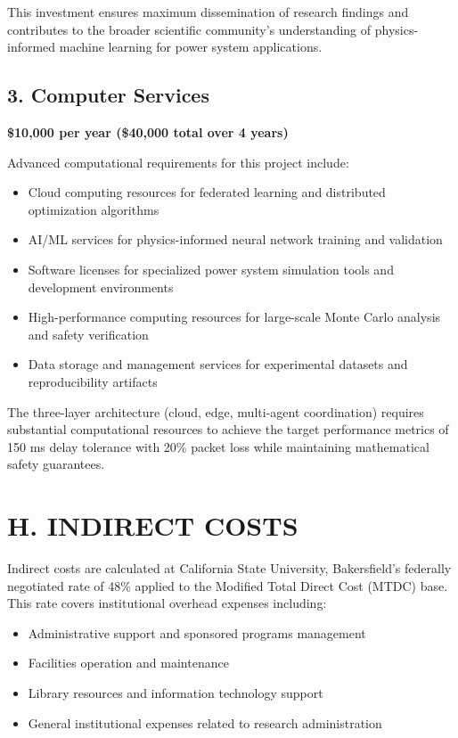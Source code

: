 \documentclass[12pt]{article}
\begin{document}
This investment ensures maximum dissemination of research findings and contributes to the broader scientific community's understanding of physics-informed machine learning for power system applications.

\subsection{3. Computer Services}

\textbf{\$10,000 per year (\$40,000 total over 4 years)}

Advanced computational requirements for this project include:
\begin{itemize}
    \item Cloud computing resources for federated learning and distributed optimization algorithms
    \item AI/ML services for physics-informed neural network training and validation
    \item Software licenses for specialized power system simulation tools and development environments
    \item High-performance computing resources for large-scale Monte Carlo analysis and safety verification
    \item Data storage and management services for experimental datasets and reproducibility artifacts
\end{itemize}

The three-layer architecture (cloud, edge, multi-agent coordination) requires substantial computational resources to achieve the target performance metrics of 150 ms delay tolerance with 20\% packet loss while maintaining mathematical safety guarantees.

\section{H. INDIRECT COSTS}

Indirect costs are calculated at California State University, Bakersfield's federally negotiated rate of 48\% applied to the Modified Total Direct Cost (MTDC) base. This rate covers institutional overhead expenses including:

\begin{itemize}
    \item Administrative support and sponsored programs management
    \item Facilities operation and maintenance
    \item Library resources and information technology support
    \item General institutional expenses related to research administration
\end{itemize}
\end{document}
